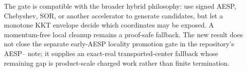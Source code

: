 
The gate is compatible with the broader hybrid philosophy: use signed AESP,
Chebyshev, SOR, or another accelerator to generate candidates, but let a
monotone KKT envelope decide which coordinates may be exposed.  A
momentum-free local cleanup remains a proof-safe fallback.  The new result
does not close the separate early-AESP locality promotion gate in the
repository's AESP--\LOCSOR{} note; it supplies an exact-real
transported-center fallback whose remaining gap is product-scale charged
work rather than finite termination.
